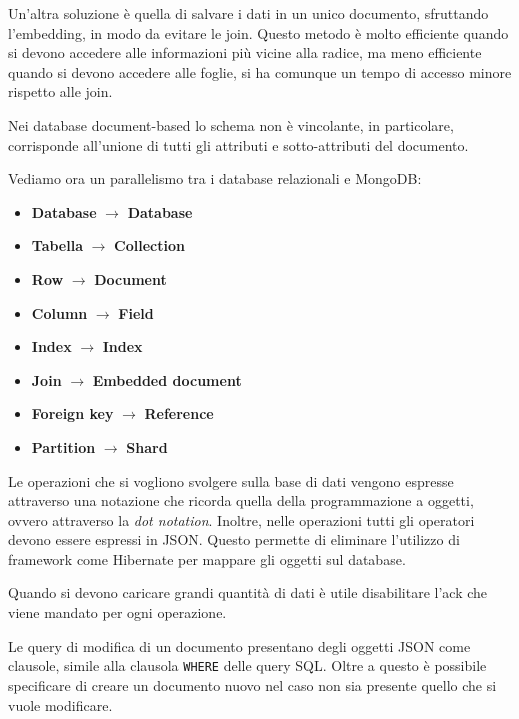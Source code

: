 Un'altra soluzione è quella di salvare i dati in un unico documento, sfruttando
l'embedding, in modo da evitare le join. Questo metodo è molto efficiente quando
si devono accedere alle informazioni più vicine alla radice, ma meno efficiente
quando si devono accedere alle foglie, si ha comunque un tempo di accesso minore
rispetto alle join.

Nei database document-based lo schema non è vincolante, in particolare, corrisponde
all'unione di tutti gli attributi e sotto-attributi del documento.

Vediamo ora un parallelismo tra i database relazionali e MongoDB:
\begin{itemize}
      \item \textbf{Database} $\rightarrow$ \textbf{Database}
      \item \textbf{Tabella} $\rightarrow$ \textbf{Collection}
      \item \textbf{Row} $\rightarrow$ \textbf{Document}
      \item \textbf{Column} $\rightarrow$ \textbf{Field}
      \item \textbf{Index} $\rightarrow$ \textbf{Index}
      \item \textbf{Join} $\rightarrow$ \textbf{Embedded document}
      \item \textbf{Foreign key} $\rightarrow$ \textbf{Reference}
      \item \textbf{Partition} $\rightarrow$ \textbf{Shard}
\end{itemize}
Le operazioni che si vogliono svolgere sulla base di dati vengono espresse
attraverso una notazione che ricorda quella della programmazione a oggetti, ovvero
attraverso la \textit{dot notation}. Inoltre, nelle operazioni tutti gli
operatori devono essere espressi in JSON. Questo permette di eliminare l'utilizzo
di framework come Hibernate per mappare gli oggetti sul database.
\begin{nota}
      Quando si devono caricare grandi quantità di dati è utile disabilitare
      l'ack che viene mandato per ogni operazione.
\end{nota}
Le query di modifica di un documento presentano degli oggetti JSON come
clausole, simile alla clausola \texttt{WHERE} delle query SQL. Oltre a questo
è possibile specificare di creare un documento nuovo nel caso non sia presente
quello che si vuole modificare.

